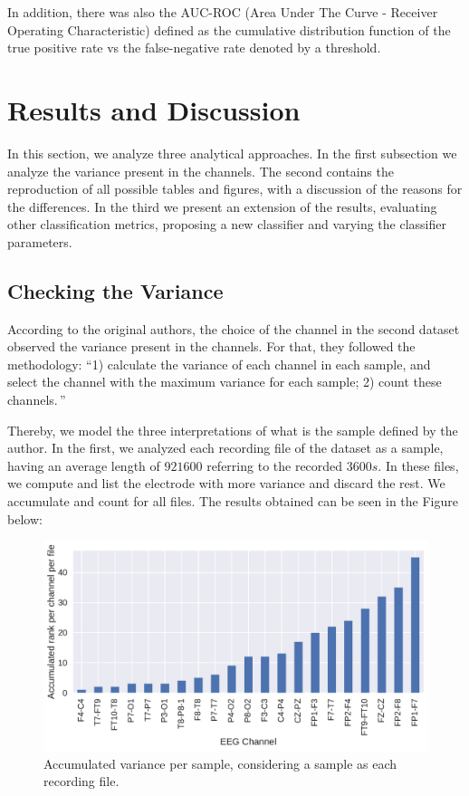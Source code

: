 In addition, there was also the AUC-ROC (Area Under The Curve - Receiver Operating Characteristic) defined as the cumulative distribution function of the true positive rate vs the false-negative rate denoted by a threshold.

\section{Results and Discussion}
\label{sec:resu}

In this section, we analyze three analytical approaches. In the first subsection we analyze the variance present in the channels. The second contains the reproduction of all possible tables and figures, with a discussion of the reasons for the differences. In the third we present an extension of the results, evaluating other classification metrics, proposing a new classifier and varying the classifier parameters.

\subsection{Checking the Variance} 

According to the original authors, the choice of the channel in the second dataset observed the variance present in the channels. For that, they followed the methodology: ``1) calculate the variance of each channel in each sample, and select the channel with the maximum variance for each sample; 2) count these channels.\,''

Thereby, we model the three interpretations of what is the sample defined by the author. In the first, we analyzed each recording file of the dataset as a sample, having an average length of $921600$ referring to the recorded $3600s$. In these files, we compute and list the electrode with more variance and discard the rest. We accumulate and count for all files. The results obtained can be seen in the Figure below:

\begin{figure}[!ht]
  \centering
  \includegraphics[width=\linewidth]{figure/variance_per_file.pdf}
  \caption{Accumulated variance per sample, considering a sample as each recording file.}
  \label{fig:variance_per_file}
\end{figure}

